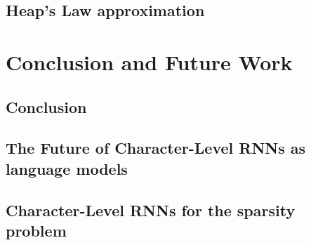 \documentclass[11pt,a4paper,twoside,openright]{scrbook}
\begin{document}
\section{Heap's Law approximation}

\chapter{Conclusion and Future Work}
\section{Conclusion}
\section{The Future of Character-Level RNNs as language models}
\section{Character-Level RNNs for the sparsity problem}



\newpage

\listoffigures
\newpage

\listoftables
\newpage

\end{document}
